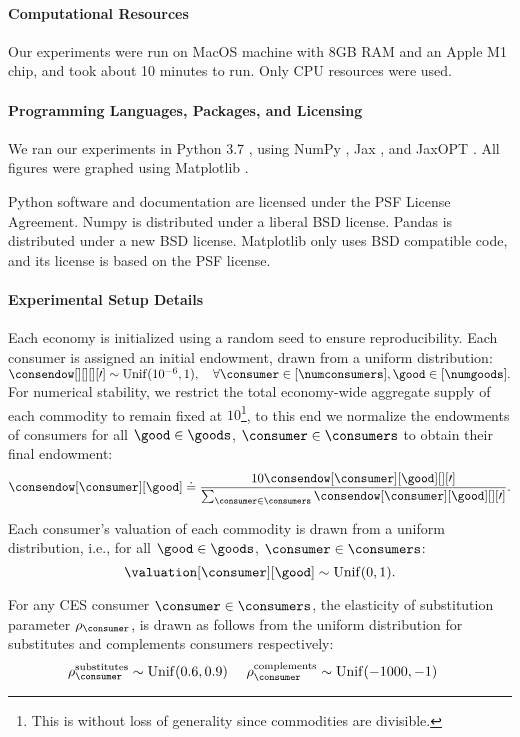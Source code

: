 \paragraph{Computational Resources}
Our experiments were run on MacOS machine with 8GB RAM and an Apple M1 chip, and took about 10 minutes to run. Only CPU resources were used.

\paragraph{Programming Languages, Packages, and Licensing}
We ran our experiments in Python 3.7 \cite{van1995python}, using NumPy \cite{numpy},  Jax \cite{jax2018github}, and  JaxOPT \cite{jaxopt_implicit_diff}.
All figures were graphed using Matplotlib \cite{matplotlib}. 

Python software and documentation are licensed under the PSF License Agreement. Numpy is distributed under a liberal BSD license. Pandas is distributed under a new BSD license. Matplotlib only uses BSD compatible code, and its license is based on the PSF license. 


\paragraph{Experimental Setup Details}


Each economy is initialized using a random seed to ensure reproducibility. Each consumer is assigned an initial endowment, drawn from a uniform distribution:
$
\consendow[][][][\prime] \sim \mathrm{Unif}(10^{-6}, 1), \quad \forall \consumer \in [\numconsumers], \good \in [\numgoods].
$
For numerical stability, we restrict the total economy-wide aggregate supply of each commodity to remain fixed at $10$\footnote{This is without loss of generality since commodities are divisible.}, to this end we normalize the endowments of consumers for all $\good \in \goods$,  $\consumer \in \consumers$ to obtain their final endowment:
\[
\consendow[\consumer][\good] \doteq \frac{10 \consendow[\consumer][\good][][\prime]}{\sum_{\consumer \in \consumers} \consendow[\consumer][\good][][\prime]}.
\]

Each consumer’s valuation of each commodity is drawn from a uniform distribution, i.e., for all $\good \in \goods$, $\consumer \in \consumers$:
\[
\valuation[\consumer][\good] \sim \mathrm{Unif}(0, 1) .
\]

For any CES consumer $\consumer \in \consumers$, the elasticity of substitution parameter $\rho_\consumer$, is drawn as follows from the uniform distribution for substitutes and complements consumers respectively:
\begin{align*}
&\rho_\consumer^{\text{substitutes}} \sim \mathrm{Unif}(0.6, 0.9) \
&\rho_\consumer^{\text{complements}} &\sim \mathrm{Unif}(-1000, -1)
\end{align*}



